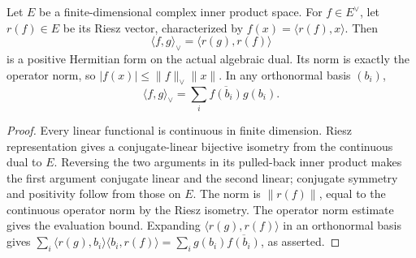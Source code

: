 \begin{lemma}
\label{lem:dual-hilbert-metric}
\leanok
Let $E$ be a finite-dimensional complex inner product space. For
$f\in E^\vee$, let $r(f)\in E$ be its Riesz vector, characterized by
$f(x)=\langle r(f),x\rangle$. Then
\[
 \langle f,g\rangle_\vee=\langle r(g),r(f)\rangle
\]
is a positive Hermitian form on the actual algebraic dual. Its norm
is exactly the operator norm, so
$|f(x)|\leq\|f\|_\vee\|x\|$. In any orthonormal basis $(b_i)$,
\[
 \langle f,g\rangle_\vee=\sum_i\overline{f(b_i)}g(b_i).
\]
\end{lemma}
\begin{proof}
Every linear functional is continuous in finite dimension. Riesz
representation gives a conjugate-linear bijective isometry from the
continuous dual to $E$. Reversing the two arguments in its pulled-back
inner product makes the first argument conjugate linear and the second
linear; conjugate symmetry and positivity follow from those on $E$.
The norm is $\|r(f)\|$, equal to the continuous operator norm by the
Riesz isometry. The operator norm estimate gives the evaluation bound.
Expanding $\langle r(g),r(f)\rangle$ in an orthonormal basis gives
$\sum_i\langle r(g),b_i\rangle\langle b_i,r(f)\rangle
=\sum_i g(b_i)\overline{f(b_i)}$, as asserted.
\end{proof}

